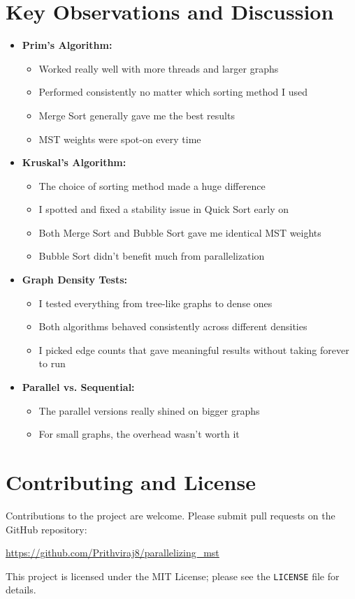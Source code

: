 \documentclass[11pt]{article}
\begin{document}
\section{Key Observations and Discussion}
\begin{itemize}
    \item \textbf{Prim's Algorithm:} 
    \begin{itemize}
        \item Worked really well with more threads and larger graphs
        \item Performed consistently no matter which sorting method I used
        \item Merge Sort generally gave me the best results
        \item MST weights were spot-on every time
    \end{itemize}
    \item \textbf{Kruskal's Algorithm:}
    \begin{itemize}
        \item The choice of sorting method made a huge difference
        \item I spotted and fixed a stability issue in Quick Sort early on
        \item Both Merge Sort and Bubble Sort gave me identical MST weights
        \item Bubble Sort didn't benefit much from parallelization
    \end{itemize}
    \item \textbf{Graph Density Tests:}
    \begin{itemize}
        \item I tested everything from tree-like graphs to dense ones
        \item Both algorithms behaved consistently across different densities
        \item I picked edge counts that gave meaningful results without taking forever to run
    \end{itemize}
    \item \textbf{Parallel vs. Sequential:} 
    \begin{itemize}
        \item The parallel versions really shined on bigger graphs
        \item For small graphs, the overhead wasn't worth it
    \end{itemize}
\end{itemize}

\section{Contributing and License}
Contributions to the project are welcome. Please submit pull requests on the GitHub repository:
\begin{center}
\url{https://github.com/Prithviraj8/parallelizing_mst}
\end{center}
This project is licensed under the MIT License; please see the \texttt{LICENSE} file for details.
\end{document}

